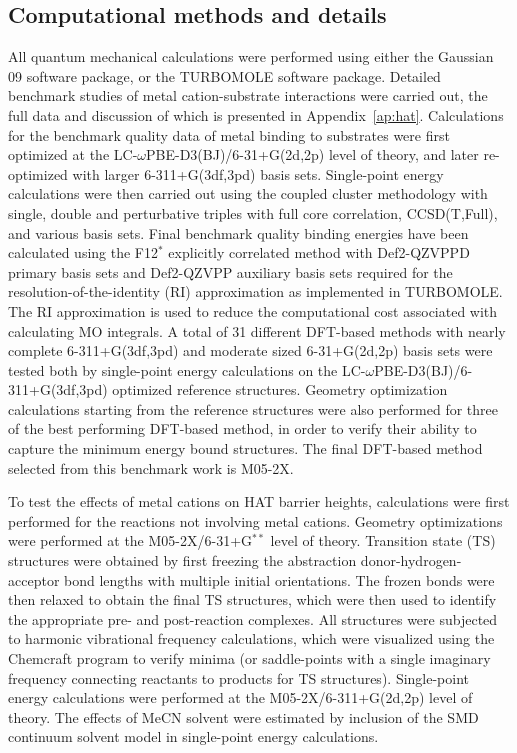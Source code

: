 \begin{doublespace}
\section{Computational methods and details}

All quantum mechanical calculations were performed using either the Gaussian 09
software package,\cite{Frisch2009} or the TURBOMOLE software
package.\cite{turbomole} Detailed benchmark studies of metal cation-substrate
interactions were carried out, the full data and discussion of which is
presented in Appendix~\ref{ap:hat}. Calculations for the benchmark quality data
of metal binding to substrates were first optimized at the
LC-$\omega$PBE-D3(BJ)/6-31+G(2d,2p) level of theory,\cite{Vydrov2006,
Vydrov2006a, Grimme2010, Johnson2006} and later re-optimized with larger
6-311+G(3df,3pd) basis sets. Single-point energy calculations were then carried
out using the coupled cluster methodology with single, double and perturbative
triples with full core correlation, CCSD(T,Full), and various basis sets. Final
benchmark quality binding energies have been calculated using the F12$^*$
explicitly correlated method with Def2-QZVPPD primary basis sets and Def2-QZVPP
auxiliary basis sets required for the resolution-of-the-identity (RI)
approximation as implemented in TURBOMOLE. The RI approximation is used to
reduce the computational cost associated with calculating MO
integrals. A total
of 31 different DFT-based methods with nearly complete 6-311+G(3df,3pd) and
moderate sized 6-31+G(2d,2p) basis sets were tested both by single-point energy
calculations on the LC-$\omega$PBE-D3(BJ)/6-311+G(3df,3pd) optimized reference
structures. Geometry optimization calculations starting from the reference
structures were also performed for three of the best performing DFT-based
method, in order to verify their ability to capture the minimum energy bound
structures. The final DFT-based method selected from this benchmark work is
M05-2X.\cite{Zhao2006}

To test the effects of metal cations on HAT barrier heights, calculations were
first performed for the reactions not involving metal cations. Geometry
optimizations were performed at the M05-2X/6-31+G$^{**}$ level of
theory. Transition state (TS) structures were obtained by first freezing the
abstraction donor-hydrogen-acceptor bond lengths with multiple initial
orientations. The frozen bonds were then relaxed to obtain the final TS
structures, which were then used to identify the appropriate pre- and
post-reaction complexes. All structures were subjected to harmonic vibrational
frequency calculations, which were visualized using the Chemcraft
program\cite{ccraft} to verify minima (or saddle-points with a single imaginary
frequency connecting reactants to products for TS structures). Single-point
energy calculations were performed at the M05-2X/6-311+G(2d,2p) level of theory.
The effects of MeCN solvent were estimated by inclusion of the
SMD\cite{Marenich2009} continuum solvent model in single-point energy
calculations.


\end{doublespace}
